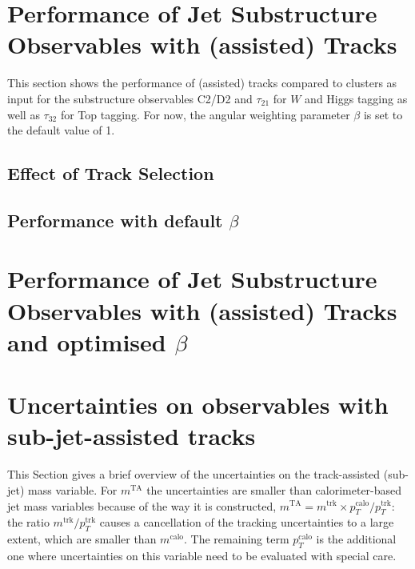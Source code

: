 \documentclass[UKenglish,texlive=2013]{\ATLASLATEXPATH atlasdoc}
\newcommand{\mta}{\ensuremath{m^\textrm{TA}}\xspace}
\newcommand{\mcal}{\ensuremath{m^\textrm{calo}}\xspace}
\begin{document}
\section{Performance of Jet Substructure Observables with (assisted) Tracks}\label{sec:def_beta}
This section shows the performance of (assisted) tracks compared to clusters as input for the substructure observables C2/D2 and $\tau_{21}$ for $W$ and Higgs tagging as well as $\tau_{32}$ for Top tagging. For now, the angular weighting parameter $\beta$ is set to the default value of 1.
\subsection{Effect of Track Selection}


\subsection{Performance with default $\beta$}


\clearpage
\newpage
\section{Performance of Jet Substructure Observables with (assisted) Tracks and optimised $\beta$}\label{sec:beta_opt}



\clearpage
\section{Uncertainties on observables with sub-jet-assisted tracks}\label{sec:syst}
This Section gives a brief overview of the uncertainties on the track-assisted (sub-jet) mass variable. 
For $\mta$ the uncertainties are smaller than calorimeter-based jet mass variables because of the way it is constructed, $\mta=m^\textrm{trk}\times p_T^\textrm{calo}/p_T^\textrm{trk}$: the ratio $m^\textrm{trk}/p_T^\textrm{trk}$ causes a cancellation of the tracking uncertainties to a large extent, which are smaller than $\mcal$. The remaining term $p_T^\textrm{calo}$ is the additional one where uncertainties on this variable need to be evaluated with special care.
\end{document}
